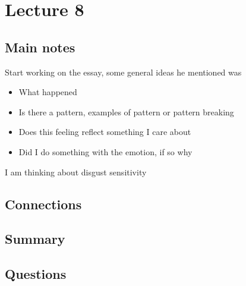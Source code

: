 \section{Lecture 8}

\subsection{Main notes}
Start working on the essay, some general ideas he mentioned was

\begin{itemize}
	\item What happened
  \item Is there a pattern, examples of pattern or pattern breaking
  \item Does this feeling reflect something I care about
  \item Did I do something with the emotion, if so why
\end{itemize}

I am thinking about disgust sensitivity

\subsection{Connections}


\subsection{Summary}


\subsection{Questions}

